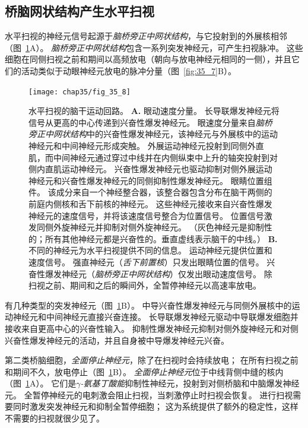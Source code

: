 \subsection{桥脑网状结构产生水平扫视}

水平扫视的神经元信号起源于\textit{脑桥旁正中网状结构}，与它投射到的外展核相邻（图~\ref{fig:35_8}A）。
\textit{脑桥旁正中网状结构}包含一系列突发神经元，可产生扫视脉冲。
这些细胞在同侧扫视之前和期间以高频放电（朝向与放电神经元相同的一侧），并且它们的活动类似于动眼神经元放电的脉冲分量（图~\ref{fig:35_7}B）。


\begin{figure}[htbp]
	\centering
	\texttt{[image: chap35/fig\_35\_8]}
	\caption{水平扫视的脑干运动回路。 
		\textbf{A.} 眼动速度分量。
		长导联爆发神经元将信号从更高的中心传递到兴奋性爆发神经元。
		眼速度分量来自\textit{脑桥旁正中网状结构}中的兴奋性爆发神经元，该神经元与外展核中的运动神经元和中间神经元形成突触。
		外展运动神经元投射到同侧外直肌，而中间神经元通过穿过中线并在内侧纵束中上升的轴突投射到对侧内直肌运动神经元。
		兴奋性爆发神经元也驱动抑制对侧外展运动神经元和兴奋性爆发神经元的同侧抑制性爆发神经元。
		眼睛位置组件。
		该成分来自一个神经整合器，该整合器包含分布在脑干两侧的前庭内侧核和舌下前核的神经元。
		这些神经元接收来自兴奋性爆发神经元的速度信号，并将该速度信号整合为位置信号。
		位置信号激发同侧外旋神经元并抑制对侧外旋神经元。 （灰色神经元是抑制性的；所有其他神经元都是兴奋性的。垂直虚线表示脑干的中线。）
		\textbf{B.} 不同的神经元为水平扫视提供不同的信息。
		运动神经元提供位置和速度信号。
		强直神经元（\textit{舌下前置核}）只发出眼睛位置的信号。
		兴奋性爆发神经元（\textit{脑桥旁正中网状结构}）仅发出眼动速度信号。
		除扫视之前、期间和之后的瞬间外，全暂停神经元以高速率放电。}
	\label{fig:35_8}
\end{figure}


有几种类型的突发神经元（图~\ref{fig:35_8}B）。
中导兴奋性爆发神经元与同侧外展核中的运动神经元和中间神经元直接兴奋连接。
长导联爆发神经元驱动中导联爆发细胞并接收来自更高中心的兴奋性输入。
抑制性爆发神经元抑制对侧外旋神经元和对侧兴奋性爆发神经元的活动，并且自身被中导爆发神经元兴奋。


第二类桥脑细胞，\textit{全面停止神经元}，除了在扫视时会持续放电；
在所有扫视之前和期间不久，放电停止（图~\ref{fig:35_8}B）。
\textit{全面停止神经元}位于中线背侧中缝的核内（图~\ref{fig:35_8}A）。
它们是\textit{$ \gamma $-氨基丁酸能}抑制性神经元，投射到对侧桥脑和中脑爆发神经元。
全暂停神经元的电刺激会阻止扫视，当刺激停止时扫视会恢复。
进行扫视需要同时激发突发神经元和抑制全暂停细胞；
这为系统提供了额外的稳定性，这样不需要的扫视就很少见了。


